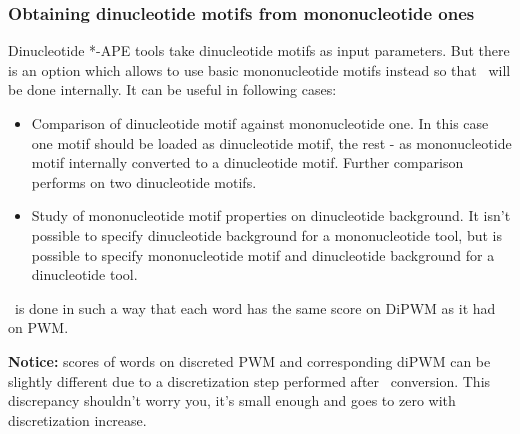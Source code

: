\subsubsection{Obtaining dinucleotide motifs from mononucleotide ones}
Dinucleotide *-APE tools take dinucleotide motifs as input parameters. But there is an option  which allows to use basic mononucleotide motifs instead so that \PwmToDiPwm\ will be done internally. It can be useful in following cases:
\begin{itemize}
\item Comparison of dinucleotide motif against mononucleotide one. In this case one motif should be loaded as dinucleotide motif, the rest - as mononucleotide motif internally converted to a dinucleotide motif. Further comparison performs on two dinucleotide motifs.
\item Study of mononucleotide motif properties on dinucleotide background. It isn't possible to specify dinucleotide background for a mononucleotide tool, but is possible to specify mononucleotide motif and dinucleotide background for a dinucleotide tool. 
\end{itemize}

\PwmToDiPwm\ is done in such a way that each word has the same score on DiPWM as it had on PWM.

{\small\textbf{Notice:} scores of words on discreted PWM and corresponding diPWM can be slightly different due to a discretization step performed after \PwmToDiPwm\ conversion. This discrepancy shouldn't worry you, it's small enough and goes to zero with discretization increase.}
